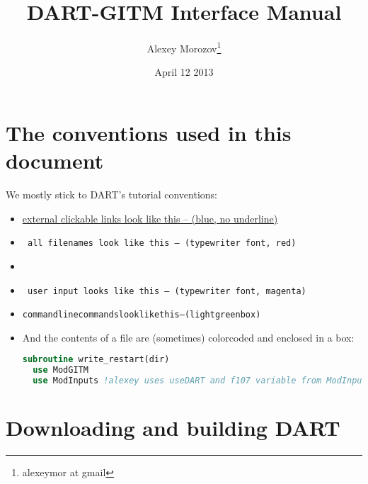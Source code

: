 \documentclass[letterpaper, 11 pt]{article}
\title{DART-GITM Interface Manual}
\author{Alexey Morozov\footnote{alexeymor at gmail}}
\date{April 12 2013}
\newcommand{\file}[1]{ {\tt \color{red} #1} }
\newcommand{\prog}[1]{ \emph{\color{d_gr}{#1}} }
\newcommand{\user}[1]{ {\tt \color{mauve} #1} }
\newcommand{\cmd}[1]{\begin{alltt}\colorbox{p_gr}{#1}\end{alltt} }
\begin{document}
\maketitle

\tableofcontents 

\section{The conventions used in this document}

We mostly stick to DART's tutorial conventions:
\begin{itemize}
\item \href{http://www.image.ucar.edu/DAReS/DART/DART_Starting.php}{external clickable links look like this -- (blue, no underline)} 
\item \file{all filenames look like this -- (typewriter font, red)}

\item \prog{program names look like this -- (italicized font, green)}

\item \user{user input looks like this -- (typewriter font, magenta)}

\item \cmd{command line commands look like this -- (light green box)}

\item And the contents of a file are (sometimes) colorcoded and enclosed in a box:
  \begin{lstlisting}[language=fortran, caption=Sample code from \file{GITM2/src/restart.f90}, label=sample_code]
subroutine write_restart(dir)
  use ModGITM
  use ModInputs !alexey uses useDART and f107 variable from ModInputs as estimate updated by DART, f107a is assumed = f107
  \end{lstlisting}
\end{itemize}

\section{Downloading and building DART}
\end{document}
